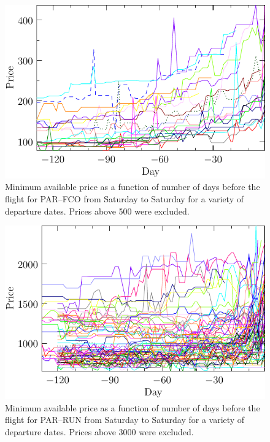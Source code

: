 \documentclass{article}
\begin{document}
\begin{figure}
  \begin{center}
    \includegraphics{pdf/PARFCO_SAT_7_nonorm}
    \caption{Minimum available price as a function of number of days
      before the flight for PAR--FCO from Saturday to Saturday for a
      variety of departure dates. Prices above 500 were excluded.}
    \label{PARFCO_SAT_7_nonorm}
  \end{center}
\end{figure}

\begin{figure}
  \begin{center}
    \includegraphics{pdf/PARRUN_SAT_7_nonorm}
    \caption{Minimum available price as a function of number of days
      before the flight for PAR--RUN from Saturday to Saturday for a
      variety of departure dates. Prices above 3000 were excluded.}
    \label{PARRUN_SAT_7_nonorm}
  \end{center}
\end{figure}
\end{document}
